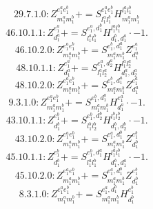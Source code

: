 \documentclass[letterpaper,10pt,fleqn,leqno,onecolumn]{article}
\begin{document}
\begin{equation} \;\;\;\;\;\;  29.7.1.0: Z^{e_{1}^{a}e_{1}^{b}}_{m_{1}^{a}m_{1}^{b}}+=S^{e_{1}^{a}e_{1}^{b}}_{l_{1}^{a}l_{1}^{b}}H^{l_{1}^{a}l_{1}^{b}}_{m_{1}^{a}m_{1}^{b}} \end{equation}
\begin{equation} \;\;\;\;\;\;  46.10.1.1: Z^{e_{1}^{a}}_{d_{1}^{a}}+=S^{e_{1}^{a},d_{1}^{b}}_{l_{1}^{a}l_{1}^{b}}H^{l_{1}^{a}l_{1}^{b}}_{d_{1}^{b},d_{1}^{a}}\cdot -1. \end{equation}
\begin{equation} \;\;\;\;\;\;  46.10.2.0: Z^{e_{1}^{a}e_{1}^{b}}_{m_{1}^{a}m_{1}^{b}}+=S^{e_{1}^{b},d_{1}^{a}}_{m_{1}^{a}m_{1}^{b}}Z^{e_{1}^{a}}_{d_{1}^{a}} \end{equation}
\begin{equation} \;\;\;\;\;\;  48.10.1.1: Z^{e_{1}^{a}}_{d_{1}^{a}}+=S^{e_{1}^{a},d_{2}^{a}}_{l_{1}^{a}l_{2}^{a}}H^{l_{1}^{a}l_{2}^{a}}_{d_{1}^{a},d_{2}^{a}} \end{equation}
\begin{equation} \;\;\;\;\;\;  48.10.2.0: Z^{e_{1}^{a}e_{1}^{b}}_{m_{1}^{a}m_{1}^{b}}+=S^{e_{1}^{b},d_{1}^{a}}_{m_{1}^{a}m_{1}^{b}}Z^{e_{1}^{a}}_{d_{1}^{a}} \end{equation}
\begin{equation} \;\;\;\;\;\;  9.3.1.0: Z^{e_{1}^{a}e_{1}^{b}}_{m_{1}^{a}m_{1}^{b}}+=S^{e_{1}^{b},d_{1}^{a}}_{m_{1}^{a}m_{1}^{b}}H^{e_{1}^{a}}_{d_{1}^{a}}\cdot -1. \end{equation}
\begin{equation} \;\;\;\;\;\;  43.10.1.1: Z^{e_{1}^{b}}_{d_{1}^{b}}+=S^{e_{1}^{b},d_{2}^{b}}_{l_{1}^{b}l_{2}^{b}}H^{l_{1}^{b}l_{2}^{b}}_{d_{1}^{b},d_{2}^{b}}\cdot -1. \end{equation}
\begin{equation} \;\;\;\;\;\;  43.10.2.0: Z^{e_{1}^{a}e_{1}^{b}}_{m_{1}^{a}m_{1}^{b}}+=S^{e_{1}^{a},d_{1}^{b}}_{m_{1}^{a}m_{1}^{b}}Z^{e_{1}^{b}}_{d_{1}^{b}} \end{equation}
\begin{equation} \;\;\;\;\;\;  45.10.1.1: Z^{e_{1}^{b}}_{d_{1}^{b}}+=S^{e_{1}^{b},d_{1}^{a}}_{l_{1}^{a}l_{1}^{b}}H^{l_{1}^{a}l_{1}^{b}}_{d_{1}^{b},d_{1}^{a}}\cdot -1. \end{equation}
\begin{equation} \;\;\;\;\;\;  45.10.2.0: Z^{e_{1}^{a}e_{1}^{b}}_{m_{1}^{a}m_{1}^{b}}+=S^{e_{1}^{a},d_{1}^{b}}_{m_{1}^{a}m_{1}^{b}}Z^{e_{1}^{b}}_{d_{1}^{b}} \end{equation}
\begin{equation} \;\;\;\;\;\;  8.3.1.0: Z^{e_{1}^{a}e_{1}^{b}}_{m_{1}^{a}m_{1}^{b}}+=S^{e_{1}^{a},d_{1}^{b}}_{m_{1}^{a}m_{1}^{b}}H^{e_{1}^{b}}_{d_{1}^{b}} \end{equation}
\end{document}
